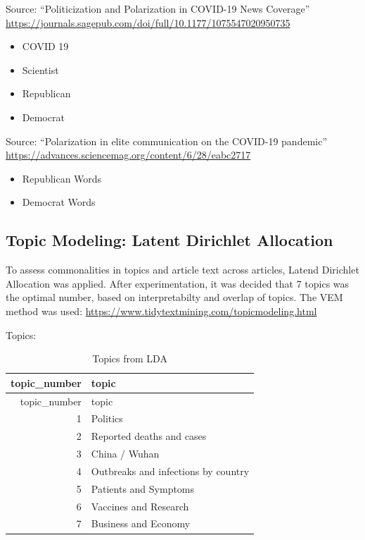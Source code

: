 \documentclass[
]{article}
\begin{document}
Source: ``Politicization and Polarization in COVID-19 News Coverage''
\url{https://journals.sagepub.com/doi/full/10.1177/1075547020950735}

\begin{itemize}
\item
  COVID 19
\item
  Scientist
\item
  Republican
\item
  Democrat
\end{itemize}

Source: ``Polarization in elite communication on the COVID-19 pandemic''
\url{https://advances.sciencemag.org/content/6/28/eabc2717}

\begin{itemize}
\item
  Republican Words
\item
  Democrat Words
\end{itemize}

\hypertarget{topic-modeling-latent-dirichlet-allocation}{%
\subsection{Topic Modeling: Latent Dirichlet
Allocation}\label{topic-modeling-latent-dirichlet-allocation}}

To assess commonalities in topics and article text across articles,
Latend Dirichlet Allocation was applied. After experimentation, it was
decided that 7 topics was the optimal number, based on interpretabilty
and overlap of topics. The VEM method was used:
\url{https://www.tidytextmining.com/topicmodeling.html}

Topics:

\begin{longtable}[]{@{}rl@{}}
\caption{Topics from LDA}\tabularnewline
\toprule
topic\_number & topic\tabularnewline
\midrule
\endfirsthead
\toprule
topic\_number & topic\tabularnewline
\midrule
\endhead
1 & Politics\tabularnewline
2 & Reported deaths and cases\tabularnewline
3 & China / Wuhan\tabularnewline
4 & Outbreaks and infections by country\tabularnewline
5 & Patients and Symptoms\tabularnewline
6 & Vaccines and Research\tabularnewline
7 & Business and Economy\tabularnewline
\bottomrule
\end{longtable}
\end{document}
